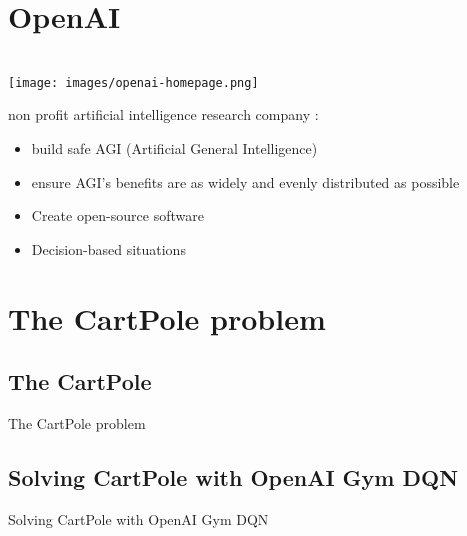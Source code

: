 \documentclass[12pt,serif,mathserif,compress]{beamer}
\begin{document}
\section{OpenAI}

\begin{frame}{\\[-4mm] \texttt{[image: images/openai-homepage.png]} }
  \begin{tcolorbox}[title=Who is OpenAI ? What do they do ?]
    non profit artificial intelligence research company :
    \begin{itemize}
    \item build safe AGI (Artificial General Intelligence)
    \item ensure AGI's benefits are as widely and evenly distributed as possible
    \item Create open-source software
    \item Decision-based situations
    \end{itemize}
  \end{tcolorbox}  
\end{frame}

\section{The CartPole problem}

\subsection{The CartPole}
\begin{frame}{The CartPole problem}
  
\end{frame}

\subsection{Solving CartPole with OpenAI Gym DQN}
\begin{frame}{Solving CartPole with OpenAI Gym DQN}
  
\end{frame}
\end{document}

